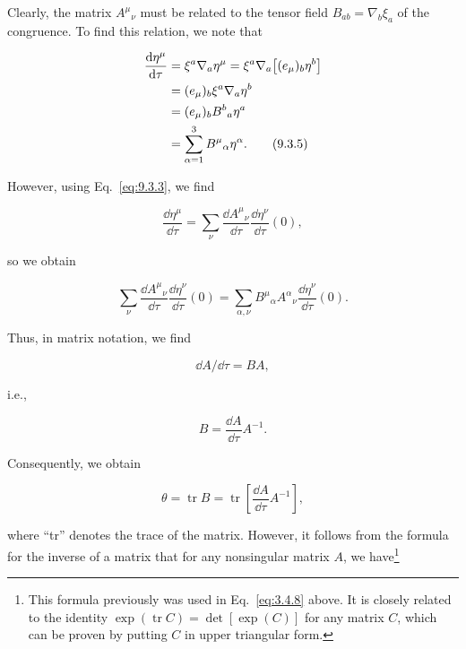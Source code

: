 Clearly, the matrix \(A^\mu{}_\nu\) must be related to the tensor field
\(B_{ab}=\nabla_b\xi_a\) of the congruence. To find this relation, we note that

\begin{align}
  \frac{\mathop{}\!\mathrm{d}\eta^\mu}{\mathop{}\!\mathrm{d}\tau}
  &=\xi^a\nabla_a\eta^\mu
    =\xi^a\nabla_a\bigl[(e_\mu)_b\eta^b\bigr]\notag\\
  &=(e_\mu)_b\xi^a\nabla_a\eta^b\notag\\
  &=(e_\mu)_bB^b{}_a\eta^a\notag\\
  &=\sum_{\alpha=1}^3B^\mu{}_\alpha\eta^\alpha .
  \tag{9.3.5}\label{eq:9.3.5}
\end{align}

However, using Eq.~\eqref{eq:9.3.3}, we find

\begin{equation}
  \frac{\dd\eta^\mu}{\dd\tau}
  =\sum_\nu
    \frac{\dd A^\mu{}_\nu}{\dd\tau}
    \frac{\dd\eta^\nu}{\dd\tau}(0) ,
  \tag{9.3.6}\label{eq:9.3.6}
\end{equation}

so we obtain

\begin{equation}
  \sum_\nu
  \frac{\dd A^\mu{}_\nu}{\dd\tau}\frac{\dd\eta^\nu}{\dd\tau}(0)
  =
  \sum_{\alpha,\nu}
  B^\mu{}_\alpha A^\alpha{}_\nu\frac{\dd\eta^\nu}{\dd\tau}(0) .
  \tag{9.3.7}\label{eq:9.3.7}
\end{equation}

Thus, in matrix notation, we find

\begin{equation}
  \dd A/\dd\tau=BA ,
  \tag{9.3.8}\label{eq:9.3.8}
\end{equation}

i.e.,

\begin{equation}
  B=\frac{\dd A}{\dd\tau}A^{-1} .
  \tag{9.3.9}\label{eq:9.3.9}
\end{equation}

Consequently, we obtain

\begin{equation}
  \theta=\operatorname{tr}B
  =\operatorname{tr}\left[\frac{\dd A}{\dd\tau}A^{-1}\right] ,
  \tag{9.3.10}\label{eq:9.3.10}
\end{equation}

where ``tr'' denotes the trace of the matrix. However, it follows from the formula for
the inverse of a matrix that for any nonsingular matrix \(A\), we have\footnote{This formula
previously was used in Eq.~\eqref{eq:3.4.8} above. It is closely related to the identity
\(\exp(\operatorname{tr}C)=\det[\exp(C)]\) for any matrix \(C\), which can be proven by
putting \(C\) in upper triangular form.}


